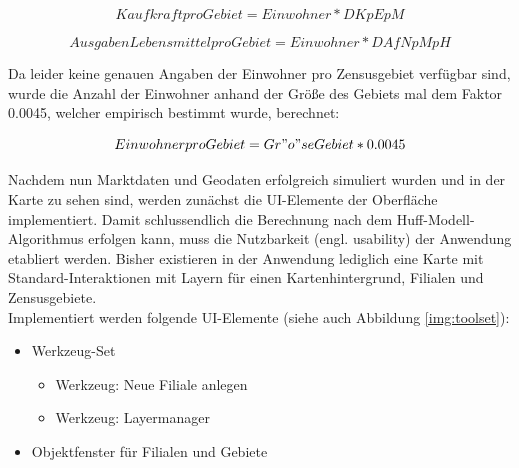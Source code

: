\begin{equation}
	Kaufkraft pro Gebiet = Einwohner * DKpEpM
\end{equation}

\begin{equation}
	Ausgaben Lebensmittel pro Gebiet = Einwohner * DAfNpMpH
\end{equation}

Da leider keine genauen Angaben der Einwohner pro Zensusgebiet verfügbar sind, wurde die Anzahl der Einwohner anhand der Größe des Gebiets mal dem Faktor 0.0045, welcher empirisch bestimmt wurde, berechnet:

\begin{equation}
	Einwohner pro Gebiet = Gr"o"se Gebiet * 0.0045
\end{equation}

Nachdem nun Marktdaten und Geodaten erfolgreich simuliert wurden und in der Karte zu sehen sind, werden zunächst die UI-Elemente der Oberfläche implementiert.
Damit schlussendlich die Berechnung nach dem Huff-Modell-Algorithmus erfolgen kann, muss die Nutzbarkeit (engl. usability) der Anwendung etabliert werden.
Bisher existieren in der Anwendung lediglich eine Karte mit Standard-Interaktionen mit Layern für einen Kartenhintergrund, Filialen und Zensusgebiete.\\
Implementiert werden folgende UI-Elemente (siehe auch Abbildung \ref{img:toolset}):

\begin{itemize}
	\item Werkzeug-Set
	\begin{itemize}
		\item Werkzeug: Neue Filiale anlegen
		\item Werkzeug: Layermanager
	\end{itemize}
	\item Objektfenster für Filialen und Gebiete
\end{itemize}

